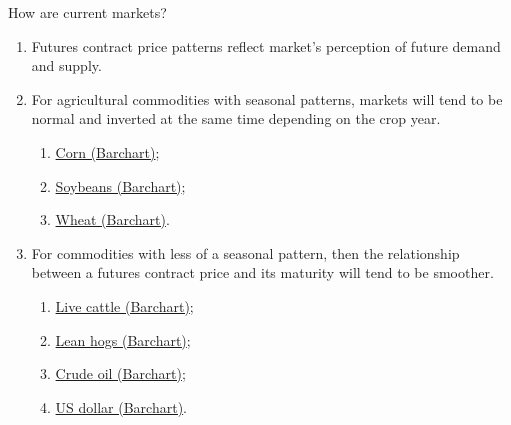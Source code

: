 \documentclass[table,xcolor=pdftex,dvipsnames]{beamer}\usepackage[]{graphicx}\usepackage[]{color}
\begin{document}

\begin{frame}{How are current markets?}
\begin{enumerate}[label=\textbullet]
      \item Futures contract price patterns reflect market's perception of future demand and supply.
      \item For agricultural commodities with seasonal patterns, markets will tend to be normal and inverted at the same time depending on the crop year.
        \begin{enumerate}[label=-]
          \item \href{http://www.barchart.com/commodityfutures/Corn_Futures/ZC}{Corn (Barchart)};
          \item \href{http://www.barchart.com/commodityfutures/Soybeans_Futures/ZS?search=ZS*}{Soybeans (Barchart)};
          \item \href{http://www.barchart.com/commodityfutures/Wheat_Futures/ZW?search=ZW*}{Wheat (Barchart)}.
        \end{enumerate}
      \item For commodities with less of a seasonal pattern, then the relationship between a futures contract price and its maturity will tend to be smoother.
          \begin{enumerate}[label=-]
            \item \href{http://www.barchart.com/commodityfutures/Live_Cattle_Futures/LE?search=LE*}{Live cattle (Barchart)};
            \item \href{http://www.barchart.com/commodityfutures/Lean_Hogs_Futures/HE?search=HE*}{Lean hogs (Barchart)};
            \item \href{http://www.barchart.com/commodityfutures/Crude_Oil_Futures/CL?search=CL*}{Crude oil (Barchart)};
            \item \href{http://www.barchart.com/commodityfutures/US_Dollar_Index_Futures/DX?search=DX*}{US dollar (Barchart)}.
          \end{enumerate}
\end{enumerate}
\end{frame}



%
%


\end{document}
